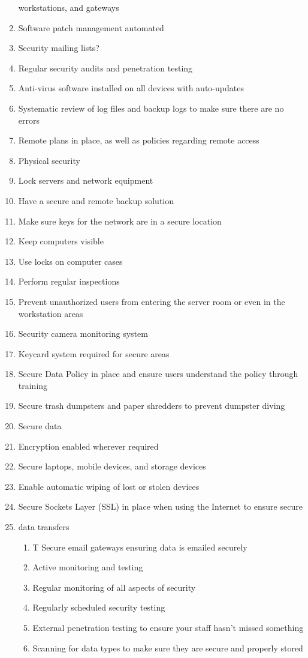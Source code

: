 \begin{enumerate}
			workstations, and gateways
			\item Software patch management automated
			\item Security mailing lists?
			\item Regular security audits and penetration testing
			\item Anti-virus software installed on all devices with auto-updates
			\item Systematic review of log files and backup logs to make sure there are no errors
			\item Remote plans in place, as well as policies regarding remote access
			\item Physical security
			\item Lock servers and network equipment
			\item Have a secure and remote backup solution
			\item Make sure keys for the network are in a secure location
			\item Keep computers visible
			\item Use locks on computer cases
			\item Perform regular inspections
			\item Prevent unauthorized users from entering the server room or even in the workstation areas
			\item Security camera monitoring system
			\item Keycard system required for secure areas
			\item Secure Data Policy in place and ensure users understand the policy through training
			\item Secure trash dumpsters and paper shredders to prevent dumpster diving
			\item Secure data
			\item Encryption enabled wherever required
			\item Secure laptops, mobile devices, and storage devices
			\item Enable automatic wiping of lost or stolen devices
			\item Secure Sockets Layer (SSL) in place when using the Internet to ensure secure
			
			\item data transfers
			
			
			\begin{enumerate}
				\item T Secure email gateways ensuring data is emailed securely
				\item  Active monitoring and testing
				\item Regular monitoring of all aspects of security
				\item Regularly scheduled security testing
				\item  External penetration testing to ensure your staff hasn’t missed something
				\item Scanning for data types to make sure they are secure and properly stored
			\end{enumerate}
		\end{enumerate}
		
